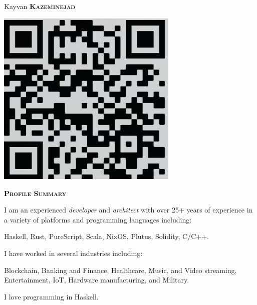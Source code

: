 \documentclass[11pt, a4paper]{article}
\newcommand{\headleft}[1]{\vspace*{3ex}\textsc{\textbf{#1}}\par%
    \vspace*{-1.5ex}\hrulefill\par\vspace*{0.7ex}}
\begin{document}
\setlength{\topskip}{0pt}
\setlength{\parindent}{0pt}
\setlength{\parskip}{0pt}
\setlength{\fboxsep}{0pt}
\pagestyle{empty}
\raggedbottom

\begin{minipage}[t]{0.33\textwidth} %
\colorbox{cvblue}{\begin{minipage}[t][5mm][t]{\textwidth}\null\hfill\null\end{minipage}}

\vspace{-.2ex} %
\colorbox{cvblue!90}{\color{white}  %
\textwidth\relax%
\begin{minipage}[t][293mm][t]{0.82\textwidth}
\raggedright
\vspace*{2.5ex}

\Large Kayvan \textbf{\textsc{Kazeminejad}} \normalsize

\null\hfill\includegraphics[width=0.65\textwidth]{qr-code.eps}\hfill\null

\vspace*{0.5ex} %

\headleft{Profile Summary}
I am an experienced \textit{developer} and \textit{architect} with over 25+ years of experience in a variety of platforms and programming languages including:\par
Haskell, Rust, PureScript, Scala, NixOS, Plutus, Solidity, C/C++.\par
I have worked in several industries including: \par
Blockchain, Banking and Finance, Healthcare, Music, and Video streaming, Entertainment, IoT, Hardware manufacturing, and Military.\par
I love programming in Haskell.


\end{minipage}}
\end{minipage}
\end{document}
